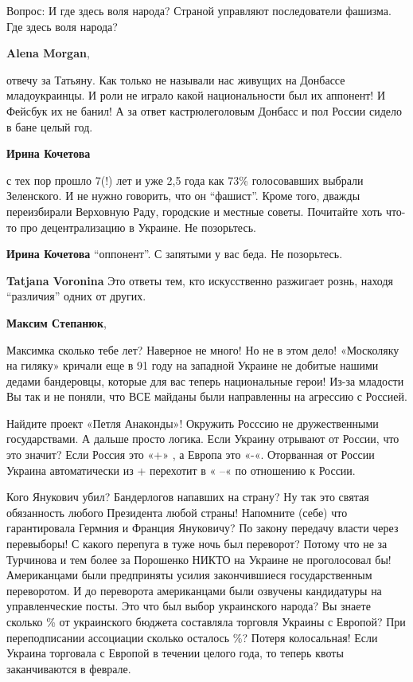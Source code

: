 \begin{itemize}
\begin{itemize}
Вопрос: И где здесь воля народа? Страной управляют последователи фашизма. Где
здесь воля народа?

\textbf{Alena Morgan}, 

отвечу за Татьяну. Как только не называли нас живущих на Донбассе
младоукраинцы. И роли не играло какой национальности был их аппонент! И Фейсбук
их не банил! А за ответ кастрюлеголовым Донбасс и пол России сидело в бане
целый год.

\textbf{Ирина Кочетова} 

с тех пор прошло 7(!) лет и уже 2,5 года как 73\% голосовавших выбрали
Зеленского. И не нужно говорить, что он \enquote{фашист}. Кроме того, дважды
переизбирали Верховную Раду, городские и местные советы. Почитайте хоть что-то
про децентрализацию в Украине. Не позорьтесь.

\textbf{Ирина Кочетова} \enquote{оппонент}. С запятыми у вас беда. Не позорьтесь.

\textbf{Tatjana Voronina} Это ответы тем, кто искусственно разжигает рознь, находя \enquote{различия} одних от других.

\textbf{Максим Степанюк}, 

Максимка сколько тебе лет? Наверное не много! Но не в этом дело! «Москоляку на
гиляку» кричали еще в 91 году на западной Украине не добитые нашими дедами
бандеровцы, которые для вас теперь национальные герои! Из-за младости Вы так и
не поняли, что ВСЕ майданы были направленны на агрессию с Россией. 

Найдите проект «Петля Анаконды»! Окружить Росссию не дружественными
государствами. А дальше просто логика. Если Украину отрывают от России, что это
значит? Если Россия это «+» , а Европа это «-«. Оторванная от России Украина
автоматически из + перехотит в « –« по отношению к России.

Кого Янукович убил? Бандерлогов напавших на страну? Ну так это святая
обязанность любого Президента любой страны! Напомните (себе) что гарантировала
Гермния и Франция Януковичу? По закону передачу власти через перевыборы! С
какого перепуга в туже ночь был переворот? Потому что не за Турчинова и тем
более за Порошенко НИКТО на Украине не проголосовал бы! Американцами были
предприняты усилия закончившиеся государственным переворотом. И до переворота
американцами были озвучены кандидатуры на управленческие посты. Это что был
выбор украинского народа? Вы знаете сколько \% от украинского бюджета составляла
торговля Украины с Европой? При переподписании ассоциации сколько осталось \%?
Потеря колосальная! Если Украина торговала с Европой в течении целого года, то
теперь квоты заканчиваются в феврале. 


\end{itemize}
\end{itemize}
